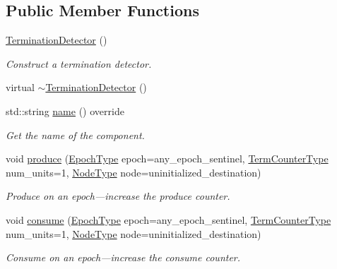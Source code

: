 \subsection*{Public Member Functions}
\begin{DoxyCompactItemize}
\item 
\hyperlink{structvt_1_1term_1_1_termination_detector_a9e6bc0a436aa1bb5f6b344ac795b3303}{Termination\+Detector} ()
\begin{DoxyCompactList}\small\item\em Construct a termination detector. \end{DoxyCompactList}\item 
virtual \hyperlink{structvt_1_1term_1_1_termination_detector_a1a1a29c2374a70427d8173ec31d55421}{$\sim$\+Termination\+Detector} ()
\item 
std\+::string \hyperlink{structvt_1_1term_1_1_termination_detector_a6cffc7850bc178af04fb542d50f82086}{name} () override
\begin{DoxyCompactList}\small\item\em Get the name of the component. \end{DoxyCompactList}\item 
void \hyperlink{structvt_1_1term_1_1_termination_detector_a3c31a1c36b5d55e9d28b5b26b2436573}{produce} (\hyperlink{namespacevt_a985a5adf291c34a3ca263b3378388236}{Epoch\+Type} epoch=any\+\_\+epoch\+\_\+sentinel, \hyperlink{namespacevt_1_1term_a4fd378cdb0c36683afc1b3399d685f7f}{Term\+Counter\+Type} num\+\_\+units=1, \hyperlink{namespacevt_a866da9d0efc19c0a1ce79e9e492f47e2}{Node\+Type} node=uninitialized\+\_\+destination)
\begin{DoxyCompactList}\small\item\em Produce on an epoch---increase the produce counter. \end{DoxyCompactList}\item 
void \hyperlink{structvt_1_1term_1_1_termination_detector_a950215186c7303d99316ece6ea31c4cd}{consume} (\hyperlink{namespacevt_a985a5adf291c34a3ca263b3378388236}{Epoch\+Type} epoch=any\+\_\+epoch\+\_\+sentinel, \hyperlink{namespacevt_1_1term_a4fd378cdb0c36683afc1b3399d685f7f}{Term\+Counter\+Type} num\+\_\+units=1, \hyperlink{namespacevt_a866da9d0efc19c0a1ce79e9e492f47e2}{Node\+Type} node=uninitialized\+\_\+destination)
\begin{DoxyCompactList}\small\item\em Consume on an epoch---increase the consume counter. \end{DoxyCompactList}\item 

\end{DoxyCompactItemize}
